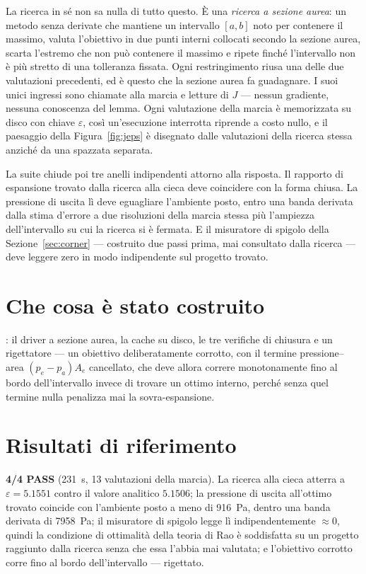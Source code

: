 La ricerca in sé non sa nulla di tutto questo. È una \emph{ricerca a
sezione aurea}: un metodo senza derivate che mantiene un intervallo
$[a,b]$ noto per contenere il massimo, valuta l'obiettivo in due
punti interni collocati secondo la sezione aurea, scarta l'estremo
che non può contenere il massimo e ripete finché l'intervallo non è
più stretto di una tolleranza fissata. Ogni restringimento riusa una
delle due valutazioni precedenti, ed è questo che la sezione aurea
fa guadagnare. I suoi unici ingressi sono chiamate alla marcia e
letture di $J$ --- nessun gradiente, nessuna conoscenza del lemma.
Ogni valutazione della marcia è memorizzata su disco con chiave
$\varepsilon$, così un'esecuzione interrotta riprende a costo nullo,
e il paesaggio della Figura~\ref{fig:jeps} è disegnato dalle
valutazioni della ricerca stessa anziché da una spazzata separata.

La suite chiude poi tre anelli indipendenti attorno alla risposta.
Il rapporto di espansione trovato dalla ricerca alla cieca deve
coincidere con la forma chiusa. La pressione di uscita lì deve
eguagliare l'ambiente posto, entro una banda derivata dalla stima
d'errore a due risoluzioni della marcia stessa più l'ampiezza
dell'intervallo su cui la ricerca si è fermata. E il misuratore di
spigolo della Sezione~\ref{sec:corner} --- costruito due passi
prima, mai consultato dalla ricerca --- deve leggere zero in modo
indipendente sul progetto trovato.

\section{Che cosa è stato costruito}

: il driver a sezione aurea,
la cache su disco, le tre verifiche di chiusura e un rigettatore ---
un obiettivo deliberatamente corrotto, con il termine
pressione--area $(p_e-p_a)A_e$ cancellato, che deve allora correre
monotonamente fino al bordo dell'intervallo invece di trovare un
ottimo interno, perché senza quel termine nulla penalizza mai la
sovra-espansione.

\section{Risultati di riferimento}

\textbf{4/4 PASS} (231~s, 13 valutazioni della marcia). La ricerca
alla cieca atterra a $\varepsilon = 5.1551$ contro il valore
analitico $5.1506$; la pressione di uscita all'ottimo trovato
coincide con l'ambiente posto a meno di 916~Pa, dentro una banda
derivata di 7958~Pa; il misuratore di spigolo legge lì
indipendentemente $\approx 0$, quindi la condizione di ottimalità
della teoria di Rao è soddisfatta su un progetto raggiunto dalla
ricerca senza che essa l'abbia mai valutata; e l'obiettivo corrotto
corre fino al bordo dell'intervallo --- rigettato.

